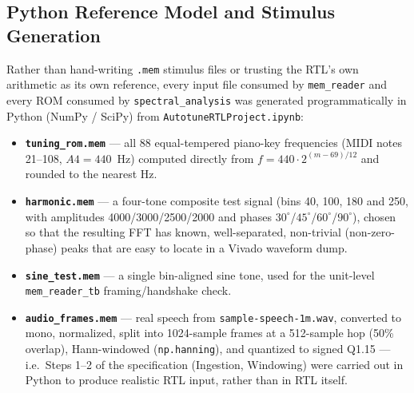 \documentclass[conference,a4paper]{IEEEtran}
\begin{document}
\subsection{Python Reference Model and Stimulus Generation}
Rather than hand-writing \texttt{.mem} stimulus files or trusting the RTL's own arithmetic
as its own reference, every input file consumed by \texttt{mem\_reader} and every ROM
consumed by \texttt{spectral\_analysis} was generated programmatically in Python
(NumPy / SciPy) from \texttt{AutotuneRTLProject.ipynb}:
\begin{itemize}
    \item \textbf{\texttt{tuning\_rom.mem}} --- all 88 equal-tempered piano-key frequencies
    (MIDI notes 21--108, $A4=440$~Hz) computed directly from $f = 440 \cdot
    2^{(m-69)/12}$ and rounded to the nearest Hz.
    \item \textbf{\texttt{harmonic.mem}} --- a four-tone composite test signal (bins 40, 100,
    180 and 250, with amplitudes 4000/3000/2500/2000 and phases $30^\circ$/$45^\circ$/$60^\circ$/$90^\circ$),
    chosen so that the resulting FFT has known, well-separated, non-trivial (non-zero-phase)
    peaks that are easy to locate in a Vivado waveform dump.
    \item \textbf{\texttt{sine\_test.mem}} --- a single bin-aligned sine tone, used for the
    unit-level \texttt{mem\_reader\_tb} framing/handshake check.
    \item \textbf{\texttt{audio\_frames.mem}} --- real speech from \texttt{sample-speech-1m.wav},
    converted to mono, normalized, split into 1024-sample frames at a 512-sample hop (50\%
    overlap), Hann-windowed (\texttt{np.hanning}), and quantized to signed Q1.15 --- i.e.\
    Steps 1--2 of the specification (Ingestion, Windowing) were carried out in Python to
    produce realistic RTL input, rather than in RTL itself.
\end{itemize}
\end{document}
